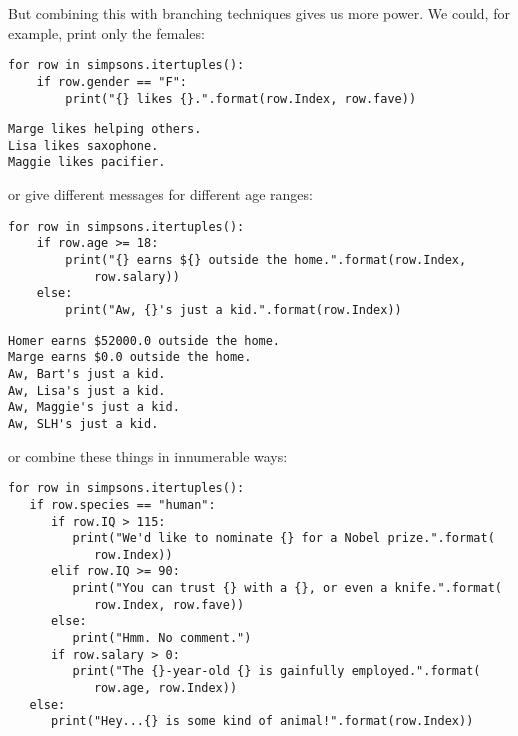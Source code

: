 But combining this with branching techniques gives us more power. We could, for
example, print only the females:

\begin{Verbatim}[fontsize=\scriptsize,samepage=true,frame=single,framesep=3mm]
for row in simpsons.itertuples():
    if row.gender == "F":
        print("{} likes {}.".format(row.Index, row.fave))
\end{Verbatim}
\vspace{-.2in}

\begin{Verbatim}[fontsize=\scriptsize,samepage=true,frame=leftline,framesep=5mm,framerule=1mm]
Marge likes helping others.
Lisa likes saxophone.
Maggie likes pacifier.
\end{Verbatim}

or give different messages for different age ranges:

\begin{Verbatim}[fontsize=\scriptsize,samepage=true,frame=single,framesep=3mm]
for row in simpsons.itertuples():
    if row.age >= 18:
        print("{} earns ${} outside the home.".format(row.Index,
            row.salary))
    else:
        print("Aw, {}'s just a kid.".format(row.Index))
\end{Verbatim}
\vspace{-.2in}

\begin{Verbatim}[fontsize=\scriptsize,samepage=true,frame=leftline,framesep=5mm,framerule=1mm]
Homer earns $52000.0 outside the home.
Marge earns $0.0 outside the home.
Aw, Bart's just a kid.
Aw, Lisa's just a kid.
Aw, Maggie's just a kid.
Aw, SLH's just a kid.
\end{Verbatim}

or combine these things in innumerable ways:

\begin{Verbatim}[fontsize=\scriptsize,samepage=true,frame=single,framesep=3mm]
for row in simpsons.itertuples():
   if row.species == "human":
      if row.IQ > 115:
         print("We'd like to nominate {} for a Nobel prize.".format(
            row.Index))
      elif row.IQ >= 90:
         print("You can trust {} with a {}, or even a knife.".format(
            row.Index, row.fave))
      else:
         print("Hmm. No comment.")
      if row.salary > 0:
         print("The {}-year-old {} is gainfully employed.".format(
            row.age, row.Index))
   else:
      print("Hey...{} is some kind of animal!".format(row.Index))
\end{Verbatim}
\vspace{-.2in}

